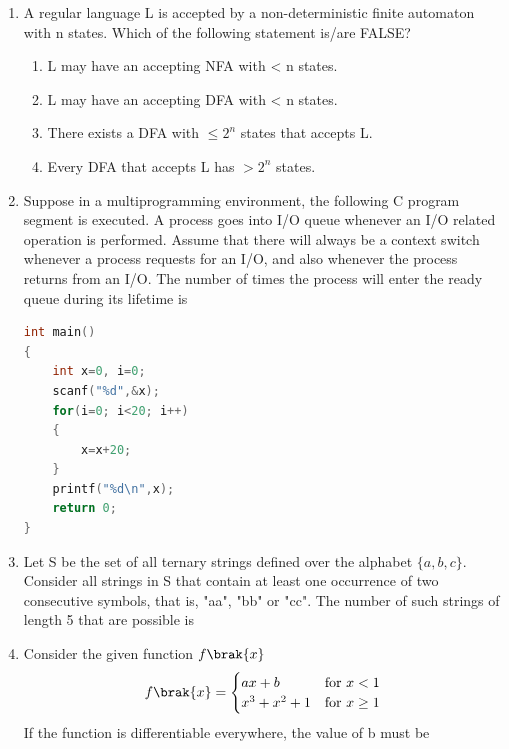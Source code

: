 \documentclass[a4paper, 11pt]{article}
\begin{document}
\begin{enumerate}
    \hfill{}

    \item A regular language L is accepted by a non-deterministic finite automaton  with n states. Which of the following statement is/are FALSE?
    \begin{enumerate}
        \item L may have an accepting NFA with < n states.
        \item L may have an accepting DFA with < n states.
        \item There exists a DFA with $\le 2^n$ states that accepts L.
        \item Every DFA that accepts L has $> 2^n$ states.
    \end{enumerate}

    \hfill{}

    \item Suppose in a multiprogramming environment, the following C program segment is executed. A process goes into I/O queue whenever an I/O related operation is performed. Assume that there will always be a context switch whenever a process requests for an I/O, and also whenever the process returns from an I/O. The number of times the process will enter the ready queue during its lifetime  is \underline{\hspace{2cm}} 
    \begin{lstlisting}[language=C]
int main()
{
    int x=0, i=0;
    scanf("%d",&x);
    for(i=0; i<20; i++)
    {
        x=x+20;
    }
    printf("%d\n",x);
    return 0;
}
    \end{lstlisting}

    \hfill{}

    \item Let S be the set of all ternary strings defined over the alphabet $\{a,b,c\}$. Consider all strings in S that contain at least one occurrence of two consecutive symbols, that is, "aa", "bb" or "cc". The number of such strings of length 5 that are possible is \underline{\hspace{2cm}} 

    \hfill{}

    \item Consider the given function $f\brak{x}$
    \[ f\brak{x} = \begin{cases} 
          ax+b & \text{for } x < 1 \\
          x^3+x^2+1 & \text{for } x \ge 1 
       \end{cases}
    \]
    If the function is differentiable everywhere, the value of b must be \underline{\hspace{2cm}} 


\end{enumerate}
\end{document}
